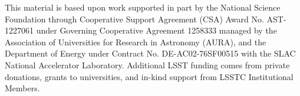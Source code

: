 \documentclass[11pt,twoside]{article}
\begin{document}
\acknowledgements

This material is based upon work supported in part by the National
Science Foundation through Cooperative Support Agreement (CSA) Award
No. AST-1227061 under Governing Cooperative Agreement 1258333 managed
by the Association of Universities for Research in Astronomy (AURA),
and the Department of Energy under Contract No. DE-AC02-76SF00515 with
the SLAC National Accelerator Laboratory.  Additional LSST funding
comes from private donations, grants to universities, and in-kind
support from LSSTC Institutional Members.

\end{document}
